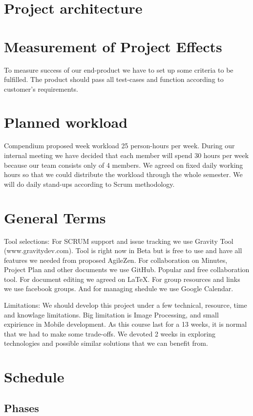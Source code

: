 \documentclass{article}
\begin{document}
\section{Project architecture}


\section{Measurement of Project Effects}
To measure success of our end-product we have to set up some criteria to be fulfilled. The product should pass all test-cases and function according to customer's requirements.

\section{Planned workload}
Compendium proposed week workload 25 person-hours per week. During our internal meeting we have decided that each member will spend 30 hours per week because our team consists only of 4 members. We agreed on fixed daily working hours so that we could distribute the workload through the whole semester. We will do daily stand-ups according to Scrum methodology.

\section{General Terms}
Tool selections:
 For SCRUM support and issue tracking we use Gravity Tool (www.gravitydev.com). Tool is right now in Beta but is free to use and have all features we needed from
 proposed AgileZen.
 For collaboration on Minutes, Project Plan and other documents we use GitHub. Popular and free collaboration tool.
 For document editing we agreed on LaTeX.
 For group resources and links we use facebook groups. And for managing shedule we use Google Calendar.
 
 Limitations:
  We should develop this project under a few technical, resource, time and knowlage limitations. Big limitation is Image Processing, and small expirience in Mobile development.
  As this course last for a 13 weeks, it is normal that we had to make some trade-offs. We devoted 2 weeks in exploring technologies and possible similar solutions that we can benefit from.
  
  
\section{Schedule}
\subsection{Phases}
\end{document}
